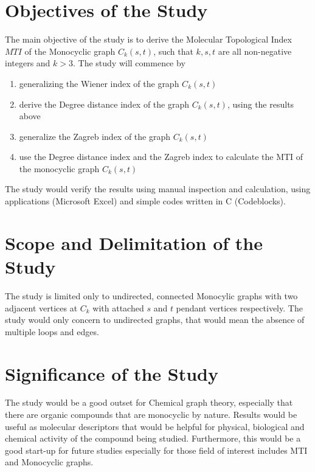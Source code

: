 \section{Objectives of the Study}
The main objective of the study is to derive the Molecular Topological Index $MTI$ of the Monocyclic graph $C_k(s,t)$, such that $k,s,t$ are all non-negative integers and $k> 3$. The study will commence by 

\begin{enumerate}
\item generalizing the Wiener index of the graph $C_k(s,t)$
\item derive the Degree distance index of the graph $C_k(s,t)$, using the results above
\item generalize the Zagreb index of the graph $C_k(s,t)$
\item use the Degree distance index and the Zagreb index to calculate the MTI of the monocyclic graph $C_k(s,t)$
\end{enumerate}

The study would verify the results using manual inspection and calculation, using applications (Microsoft Excel) and simple codes written in C (Codeblocks).

\section{Scope and Delimitation of the Study}
The study is limited only to undirected, connected Monocylic graphs with two adjacent vertices at $C_k$ with attached $s$ and $t$ pendant vertices respectively. The study would only concern to undirected graphs, that would mean the absence of multiple loops and edges.

\section{Significance of the Study}
The study would be a good outset for Chemical graph theory, especially that there are organic compounds that are monocyclic by nature. Results would be useful as molecular descriptors that would be helpful for physical, biological and chemical activity of the compound being studied. Furthermore, this would be a good start-up for future studies especially for those field of interest includes MTI and Monocyclic graphs.


